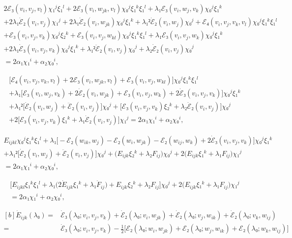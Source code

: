 \documentclass[12pt, final]{scrartcl}
\theoremstyle{definition}
\begin{document}
\begin{multline*}
  2ℰ₃(v_i, v_j,  v_l) χ₁^j ξ₁^l + 2ℰ₃(v_i, w_{jk}, v_l) χ₀^j ξ₁^k ξ₁^l + λ₁ ℰ₃(v_i,  w_j, v_k) χ₀^j ξ₁^k\\
  + 2 λ₁ \dot{ℰ}₂(v_i, v_j) χ₁^j + 2 λ₁ \dot{ℰ}₂(v_i, w_{jk}) χ₀^j ξ₁^k+ λ₁² \dot{ℰ}₂(v_i, w_j) χ₀^j + ℰ₄(v_i, v_j,  v_k, v_l) χ₀^j ξ₁^k ξ₁^l\\
  + ℰ₃(v_i, v_j, v_k) χ₀^j ξ₂^k + ℰ₃(v_i, v_j, w_{kl}) χ₀^j ξ₁^k ξ₁^l + λ₁ ℰ₃(v_i, v_j, w_k) χ₀^j ξ₁^k\\
  + 2λ₁ \dot{ℰ}₃(v_i, v_j,  v_k) χ₀^j ξ₁^k + λ₁² \ddot{ℰ}₂(v_i, v_j) χ₀^j + λ₂ \dot{ℰ}₂(v_i, v_j) χ₀^j\\
  = 2α₁χ₁^i + α₂ χ₀^i,
\end{multline*}

\begin{multline*}
  \bigl[ ℰ₄(v_i, v_j,  v_k, v_l) + 2ℰ₃(v_i, w_{jk}, v_l) + ℰ₃(v_i, v_j, w_{kl})\bigr] χ₀^j ξ₁^k ξ₁^l\\
  + λ₁ \bigl[ ℰ₃(v_i,  w_j, v_k) + 2 \dot{ℰ}₂(v_i, w_{jk}) + ℰ₃(v_i, v_j, w_k) + 2 \dot{ℰ}₃(v_i, v_j,  v_k) \bigr] χ₀^j ξ₁^k\\
  + λ₁² \bigl[\dot{ℰ}₂(v_i, w_j) + \ddot{ℰ}₂(v_i, v_j)\bigr] χ₀^j + \bigl[ℰ₃(v_i, v_j, v_k) ξ₂^k + λ₂ \dot{ℰ}₂(v_i, v_j)\bigr] χ₀^j \\
  +2\bigl[ℰ₃(v_i, v_j,  v_k)  ξ₁^k + λ₁ \dot{ℰ}₂(v_i, v_j)\bigr] χ₁^j = 2α₁χ₁^i + α₂ χ₀^i,
\end{multline*}

\begin{multline*}
  E_{ijkl} χ₀^j ξ₁^k ξ₁^l + λ₁ \bigl[ -ℰ₂(w_{ik},  w_j) - ℰ₂(w_i, w_{jk}) - ℰ₂(w_{ij}, w_k) + 2 \dot{ℰ}₃(v_i, v_j, v_k) \bigr] χ₀^j ξ₁^k\\
  + λ₁²\bigl[\dot{ℰ}₂(v_i, w_j) + \ddot{ℰ}₂(v_i, v_j)\bigr] χ₀^j + \bigl(E_{ijk} ξ₂^k + λ₂ F_{ij}\bigr) χ₀^j + 2\bigl(E_{ijk}  ξ₁^k + λ₁ F_{ij}\bigr) χ₁^j\\
  = 2α₁χ₁^i + α₂ χ₀^i,
\end{multline*}

\begin{multline*}
  \bigl[E_{ijkl} ξ₁^k ξ₁^l + λ₁\bigl(2 \dot{E}_{ijk} ξ₁^k + λ₁ \dot{F}_{ij}\bigr) + E_{ijk} ξ₂^k + λ₂ F_{ij}\bigr] χ₀^j+ 2\bigl(E_{ijk}  ξ₁^k + λ₁ F_{ij}\bigr) χ₁^j\\
  = 2α₁χ₁^i + α₂ χ₀^i,
\end{multline*}

\begin{equation*}
  \begin{aligned}[b]
    \dot{E}_{ijk}(λ₀) ={}& \dot{ℰ}₃(λ₀; v_i, v_j, v_k) + \dot{ℰ}₂(λ₀; v_i, w_{jk}) + \dot{ℰ}₂(λ₀; v_j, w_{ik}) + \dot{ℰ}₂(λ₀; v_k, w_{ij})\\
  ={}& \dot{ℰ}₃(λ₀; v_i, v_j, v_k) -\tfrac{1}{2}\bigl[ℰ₂(λ₀; w_i, w_{jk}) + ℰ₂(λ₀; w_j, w_{ik}) + ℰ₂(λ₀; w_k, w_{ij})\bigr]
  \end{aligned}
\end{equation*}
\end{document}
